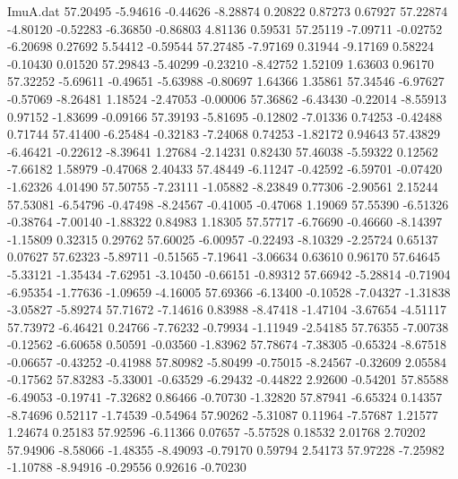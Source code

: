 \begin{filecontents}{ImuA.dat}
  57.20495   -5.94616   -0.44626   -8.28874    0.20822    0.87273    0.67927
  57.22874   -4.80120   -0.52283   -6.36850   -0.86803    4.81136    0.59531
  57.25119   -7.09711   -0.02752   -6.20698    0.27692    5.54412   -0.59544
  57.27485   -7.97169    0.31944   -9.17169    0.58224   -0.10430    0.01520
  57.29843   -5.40299   -0.23210   -8.42752    1.52109    1.63603    0.96170
  57.32252   -5.69611   -0.49651   -5.63988   -0.80697    1.64366    1.35861
  57.34546   -6.97627   -0.57069   -8.26481    1.18524   -2.47053   -0.00006
  57.36862   -6.43430   -0.22014   -8.55913    0.97152   -1.83699   -0.09166
  57.39193   -5.81695   -0.12802   -7.01336    0.74253   -0.42488    0.71744
  57.41400   -6.25484   -0.32183   -7.24068    0.74253   -1.82172    0.94643
  57.43829   -6.46421   -0.22612   -8.39641    1.27684   -2.14231    0.82430
  57.46038   -5.59322    0.12562   -7.66182    1.58979   -0.47068    2.40433
  57.48449   -6.11247   -0.42592   -6.59701   -0.07420   -1.62326    4.01490
  57.50755   -7.23111   -1.05882   -8.23849    0.77306   -2.90561    2.15244
  57.53081   -6.54796   -0.47498   -8.24567   -0.41005   -0.47068    1.19069
  57.55390   -6.51326   -0.38764   -7.00140   -1.88322    0.84983    1.18305
  57.57717   -6.76690   -0.46660   -8.14397   -1.15809    0.32315    0.29762
  57.60025   -6.00957   -0.22493   -8.10329   -2.25724    0.65137    0.07627
  57.62323   -5.89711   -0.51565   -7.19641   -3.06634    0.63610    0.96170
  57.64645   -5.33121   -1.35434   -7.62951   -3.10450   -0.66151   -0.89312
  57.66942   -5.28814   -0.71904   -6.95354   -1.77636   -1.09659   -4.16005
  57.69366   -6.13400   -0.10528   -7.04327   -1.31838   -3.05827   -5.89274
  57.71672   -7.14616    0.83988   -8.47418   -1.47104   -3.67654   -4.51117
  57.73972   -6.46421    0.24766   -7.76232   -0.79934   -1.11949   -2.54185
  57.76355   -7.00738   -0.12562   -6.60658    0.50591   -0.03560   -1.83962
  57.78674   -7.38305   -0.65324   -8.67518   -0.06657   -0.43252   -0.41988
  57.80982   -5.80499   -0.75015   -8.24567   -0.32609    2.05584   -0.17562
  57.83283   -5.33001   -0.63529   -6.29432   -0.44822    2.92600   -0.54201
  57.85588   -6.49053   -0.19741   -7.32682    0.86466   -0.70730   -1.32820
  57.87941   -6.65324    0.14357   -8.74696    0.52117   -1.74539   -0.54964
  57.90262   -5.31087    0.11964   -7.57687    1.21577    1.24674    0.25183
  57.92596   -6.11366    0.07657   -5.57528    0.18532    2.01768    2.70202
  57.94906   -8.58066   -1.48355   -8.49093   -0.79170    0.59794    2.54173
  57.97228   -7.25982   -1.10788   -8.94916   -0.29556    0.92616   -0.70230

\end{filecontents}
